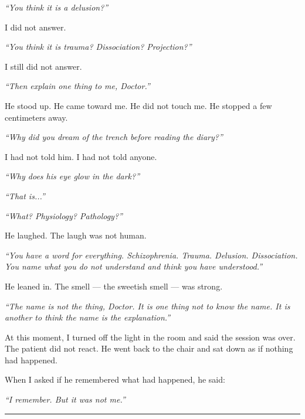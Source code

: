\noindent \textit{\textquotedblleft{}You think it is a delusion?\textquotedblright{}}

\noindent I did not answer.

\noindent \textit{\textquotedblleft{}You think it is trauma? Dissociation? Projection?\textquotedblright{}}

\noindent I still did not answer.

\noindent \textit{\textquotedblleft{}Then explain one thing to me, Doctor.\textquotedblright{}}

\noindent He stood up. He came toward me. He did not touch me. He stopped a few centimeters away.

\noindent \textit{\textquotedblleft{}Why did you dream of the trench before reading the diary?\textquotedblright{}}

\noindent I had not told him. I had not told anyone.

\noindent \textit{\textquotedblleft{}Why does his eye glow in the dark?\textquotedblright{}}

\noindent \textit{\textquotedblleft{}That is...\textquotedblright{}}

\noindent \textit{\textquotedblleft{}What? Physiology? Pathology?\textquotedblright{}}

\noindent He laughed. The laugh was not human.

\noindent \textit{\textquotedblleft{}You have a word for everything. Schizophrenia. Trauma. Delusion. Dissociation. You name what you do not understand and think you have understood.\textquotedblright{}}

\noindent He leaned in. The smell --- the sweetish smell --- was strong.

\noindent \textit{\textquotedblleft{}The name is not the thing, Doctor. It is one thing not to know the name. It is another to think the name is the explanation.\textquotedblright{}}

\noindent At this moment, I turned off the light in the room and said the session was over. The patient did not react. He went back to the chair and sat down as if nothing had happened.

\noindent When I asked if he remembered what had happened, he said:

\noindent \textit{\textquotedblleft{}I remember. But it was not me.\textquotedblright{}}

\vspace{0.5em}\noindent\rule{\textwidth}{0.5pt}\vspace{0.5em}

